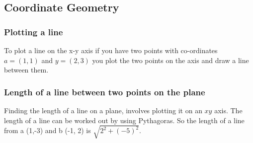 \documentclass{article}
\begin{document}
\newpage
\subsection{Coordinate Geometry}
\subsubsection{Plotting a line}
To plot a line on the x-y axis if you have two points with co-ordinates $a = (1,1)$ and $y = (2,3)$ you plot the two points on the axis and draw a line between them.





\subsubsection{Length of a line between two points on the plane}
Finding the length of a line on a plane, involves plotting it on an $x y $ axis. The length of a line can be worked out by using Pythagoras. So the length of a line from a (1,-3) and b (-1, 2) is $ \sqrt{2^{2} + (-5)^{2}}$.
 
\end{document}
